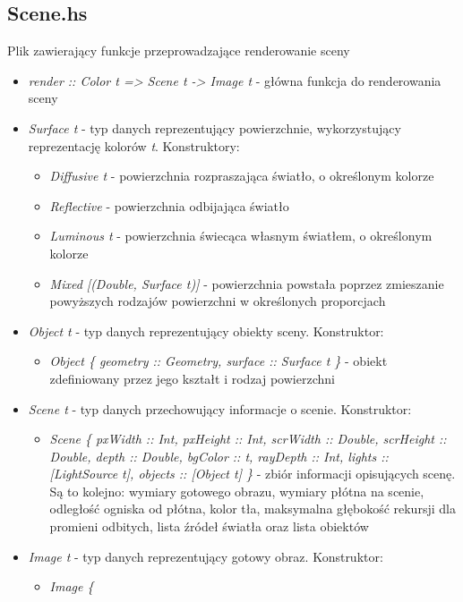 \documentclass[11pt,a4paper]{article}
\begin{document}
\subsection{Scene.hs}
Plik zawierający funkcje przeprowadzające renderowanie sceny
\begin{itemize}
\item\textit{render :: Color t => Scene t -> Image t} - główna funkcja do renderowania sceny
\item\textit{Surface t} - typ danych reprezentujący powierzchnie, wykorzystujący reprezentację kolorów \textit{t}. Konstruktory:
\begin{itemize}
\item\textit{Diffusive t} - powierzchnia rozpraszająca światło, o określonym kolorze
\item\textit{Reflective} - powierzchnia odbijająca światło
\item\textit{Luminous t} - powierzchnia świecąca własnym światłem, o określonym kolorze
\item\textit{Mixed [(Double, Surface t)]} - powierzchnia powstała poprzez zmieszanie powyższych rodzajów powierzchni w określonych proporcjach
\end{itemize}
\item\textit{Object t} - typ danych reprezentujący obiekty sceny. Konstruktor:
\begin{itemize}
\item\textit{Object \{
    geometry :: Geometry,
    surface :: Surface t
\}} - obiekt zdefiniowany przez jego kształt i rodzaj powierzchni
\end{itemize}
\item\textit{Scene t} - typ danych przechowujący informacje o scenie. Konstruktor:
\begin{itemize}
\item\textit{Scene \{
    pxWidth :: Int,
    pxHeight :: Int,
    scrWidth :: Double,
    scrHeight :: Double,
    depth :: Double,
    bgColor :: t,
    rayDepth :: Int,
    lights :: [LightSource t],
    objects :: [Object t]
\}} - zbiór informacji opisujących scenę. Są to kolejno: wymiary gotowego obrazu, wymiary płótna na scenie, odległość ogniska od płótna, kolor tła, maksymalna głębokość rekursji dla promieni odbitych, lista źródeł światła oraz lista obiektów
\end{itemize}
\item\textit{Image t} - typ danych reprezentujący gotowy obraz. Konstruktor:
\begin{itemize}
\item\textit{Image \{
}
\end{itemize}
\end{itemize}
\end{document}
